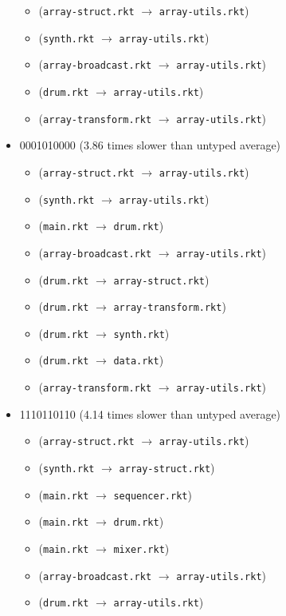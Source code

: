 \documentclass{article}
\newcommand{\mono}[1]{\texttt{#1}}
\begin{document}
\begin{itemize}
\begin{itemize}
  \item (\mono{array-struct.rkt} $\rightarrow$ \mono{array-utils.rkt})
  \item (\mono{synth.rkt} $\rightarrow$ \mono{array-utils.rkt})
  \item (\mono{array-broadcast.rkt} $\rightarrow$ \mono{array-utils.rkt})
  \item (\mono{drum.rkt} $\rightarrow$ \mono{array-utils.rkt})
  \item (\mono{array-transform.rkt} $\rightarrow$ \mono{array-utils.rkt})
  \end{itemize}
\item 0001010000 (3.86 times slower than untyped average)
  \begin{itemize}
  \item (\mono{array-struct.rkt} $\rightarrow$ \mono{array-utils.rkt})
  \item (\mono{synth.rkt} $\rightarrow$ \mono{array-utils.rkt})
  \item (\mono{main.rkt} $\rightarrow$ \mono{drum.rkt})
  \item (\mono{array-broadcast.rkt} $\rightarrow$ \mono{array-utils.rkt})
  \item (\mono{drum.rkt} $\rightarrow$ \mono{array-struct.rkt})
  \item (\mono{drum.rkt} $\rightarrow$ \mono{array-transform.rkt})
  \item (\mono{drum.rkt} $\rightarrow$ \mono{synth.rkt})
  \item (\mono{drum.rkt} $\rightarrow$ \mono{data.rkt})
  \item (\mono{array-transform.rkt} $\rightarrow$ \mono{array-utils.rkt})
  \end{itemize}
\item 1110110110 (4.14 times slower than untyped average)
  \begin{itemize}
  \item (\mono{array-struct.rkt} $\rightarrow$ \mono{array-utils.rkt})
  \item (\mono{synth.rkt} $\rightarrow$ \mono{array-struct.rkt})
  \item (\mono{main.rkt} $\rightarrow$ \mono{sequencer.rkt})
  \item (\mono{main.rkt} $\rightarrow$ \mono{drum.rkt})
  \item (\mono{main.rkt} $\rightarrow$ \mono{mixer.rkt})
  \item (\mono{array-broadcast.rkt} $\rightarrow$ \mono{array-utils.rkt})
  \item (\mono{drum.rkt} $\rightarrow$ \mono{array-utils.rkt})

\end{itemize}
\end{itemize}
\end{document}
